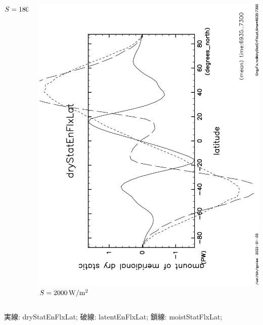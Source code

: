 \documentclass[aspectratio=149,9pt,fleqn]{beamer}
\begin{document}
\begin{frame}
\begin{columns}[T]
\begin{column}{.3\textwidth}
			\(S=1800\hmu{W/m^2}\)
		\end{column}
		\begin{column}{.3\textwidth}
			\centering
			\includegraphics[height=\textwidth,angle=-90]{S2000/EngyFlx,time=6935:7300-crop.pdf}
			\(S=2000\hmu{W/m^2}\)
		\end{column}
	\end{columns}
	実線: dryStatEnFlxLat; 破線: latentEnFlxLat; 鎖線: moistStatFlxLat;
\end{frame}
\end{document}

